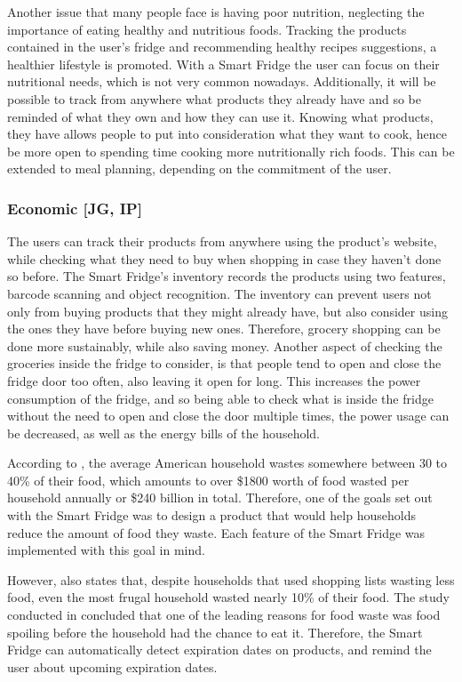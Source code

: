 Another issue that many people face is having poor nutrition, neglecting the importance of eating healthy and nutritious foods.
Tracking the products contained in the user's fridge and recommending healthy recipes suggestions, a healthier lifestyle is promoted.
With a Smart Fridge the user can focus on their nutritional needs, which is not very common nowadays.
Additionally, it will be possible to track from anywhere what products they already have and so be reminded of what they own and how they can use it.
Knowing what products, they have allows people to put into consideration what they want to cook, hence be more open to spending time cooking more nutritionally rich foods.
This can be extended to meal planning, depending on the commitment of the user.

\subsubsection{Economic [JG, IP]}

The users can track their products from anywhere using the product's website, while checking what they need to buy when shopping in case they haven't done so before.
The Smart Fridge's inventory records the products using two features, barcode scanning and object recognition.
The inventory can prevent users not only from buying products that they might already have, but also consider using the ones they have before buying new ones.
Therefore, grocery shopping can be done more sustainably, while also saving money.
Another aspect of checking the groceries inside the fridge to consider, is that people tend to open and close the fridge door too often, also leaving it open for long.
This increases the power consumption of the fridge, and so being able to check what is inside the fridge without the need to open and close the door multiple times, the power usage can be decreased, as well as the energy bills of the household.

According to \cite{bandoim_2020}, the average American household wastes somewhere between 30 to 40\% of their food, which amounts to over \$1800 worth of food wasted per household annually or \$240 billion in total.
Therefore, one of the goals set out with the Smart Fridge was to design a product that would help households reduce the amount of food they waste.
Each feature of the Smart Fridge was implemented with this goal in mind.

However, \cite{bandoim_2020} also states that, despite households that used shopping lists wasting less food, even the most frugal household wasted nearly 10\% of their food.
The study conducted in \cite{bandoim_2020} concluded that one of the leading reasons for food waste was food spoiling before the household had the chance to eat it.
Therefore, the Smart Fridge can automatically detect expiration dates on products, and remind the user about upcoming expiration dates.

